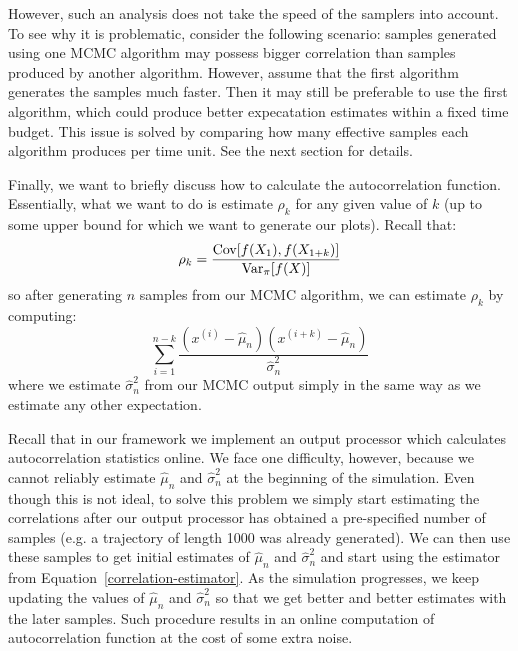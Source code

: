 \documentclass[report.tex]{subfiles}
\begin{document}
However, such an analysis does not take the speed of the samplers into account.
To see why it is problematic, consider the following scenario: samples generated using
one MCMC algorithm may possess bigger correlation than samples produced by another algorithm.
However, assume that the first algorithm generates the samples much faster. Then
it may still be preferable to use the first algorithm, which could produce better
expecatation estimates within a fixed time budget.
This issue is solved by comparing how many effective samples each
algorithm produces per time unit. See the next section for details.

Finally, we want to briefly discuss how to calculate the autocorrelation
function. Essentially, what we want to do is estimate $\rho_{k}$ for any given
value of $k$ (up to some upper bound for which we want to generate our plots).
Recall that:
$$
\rho_{k} = \frac{\mathrm{Cov}\!\left[{f(X_{1})}, {f(X_{1 + k})}\right]}{\mathrm{Var}_{{\pi}}\!\left[{f(X)}\right]}
$$
so after generating $n$ samples from our MCMC algorithm, we can estimate $\rho_{k}$
by computing:
\begin{equation}
\label{correlation-estimator}
\sum_{i=1}^{n-k} \frac{(x^{(i)} - \hat{\mu}_{n})(x^{(i+k)} - \hat{\mu}_{n})}{\hat{\sigma}_{n}^{2}}
\end{equation}
where we estimate $\hat{\sigma}_{n}^{2}$ from our MCMC output simply in the same way as we estimate
any other expectation.

Recall that in our framework we implement an output processor which calculates autocorrelation
statistics online.
We face one difficulty, however, because we cannot reliably estimate $\hat{\mu}_{n}$
and $\hat{\sigma}_{n}^{2}$ at the beginning of the simulation.
Even though this is not ideal, to solve this problem we simply start estimating
the correlations after our output processor has obtained a pre-specified number
of samples (e.g. a trajectory of length 1000 was already generated).
We can then use these samples to get initial estimates of $\hat{\mu}_{n}$ and
$\hat{\sigma}_{n}^{2}$ and start using the estimator from Equation~\ref{correlation-estimator}.
As the simulation progresses, we keep updating the values of $\hat{\mu}_{n}$ and $\hat{\sigma}_{n}^{2}$
so that we get better and better estimates with the later samples.
Such procedure results in an online computation of autocorrelation function at the
cost of some extra noise.
\end{document}
